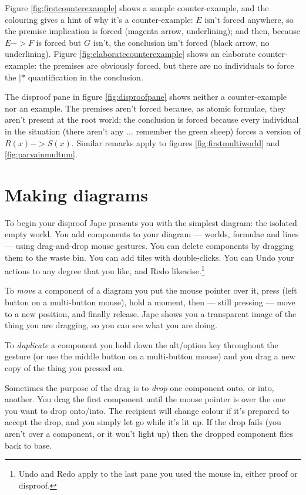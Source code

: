 \documentclass[11pt]{book}
\newcommand{\figref}[1]{figure \ref{fig:#1}}
\newcommand{\Figref}[1]{Figure \ref{fig:#1}}
\begin{document}
\Figref{firstcounterexample} shows a sample counter-example, and the colouring gives a hint of why it's a counter-example: $E$ isn't forced anywhere, so the premise implication is forced (magenta arrow, underlining); and then, because $E->F$ is forced but $G$ isn't, the conclusion isn't forced (black arrow, no underlining). \Figref{elaboratecounterexample} shows an elaborate counter-example: the premises are obviously forced, but there are no individuals to force the $|*$ quantification in the conclusion.

The disproof pane in \figref{disproofpane} shows neither a counter-example nor an example. The premises aren't forced because, as atomic formulae, they aren't present at the root world; the conclusion is forced because every individual in the situation (there aren't any ... remember the green sheep) forces a version of $R(x)->S(x)$. Similar remarks apply to figures \ref{fig:firstmultiworld} and \ref{fig:parvainmultum}.

\section{Making diagrams}

To begin your disproof Jape presents you with the simplest diagram: the isolated empty world. You add components to your diagram --- worlds, formulae and lines --- using drag-and-drop mouse gestures. You can delete components by dragging them to the waste bin. You can add tiles with double-clicks. You can Undo your actions to any degree that you like, and Redo likewise.\footnote{Undo and Redo apply to the last pane you used the mouse in, either proof or disproof.} 

To \emph{move} a component of a diagram you put the mouse pointer over it, press (left button on a multi-button mouse), hold a moment, then --- still pressing --- move to a new position, and finally release. Jape shows you a transparent image of the thing you are dragging, so you can see what you are doing.

To \emph{duplicate} a component you hold down the alt/option key throughout the gesture (or use the middle button on a multi-button mouse) and you drag a new copy of the thing you pressed on.

Sometimes the purpose of the drag is to \emph{drop} one component onto, or into, another. You drag the first component until the mouse pointer is over the one you want to drop onto/into. The recipient will change colour if it's prepared to accept the drop, and you simply let go while it's lit up. If the drop fails (you aren't over a component, or it won't light up) then the dropped component flies back to base.
\end{document}
